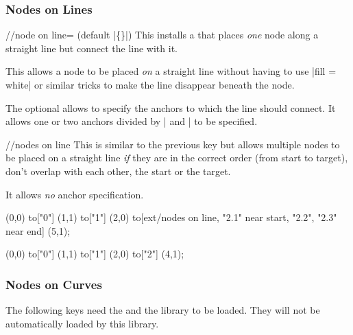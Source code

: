 \begin{multicols}{2}
\subsubsection{Nodes on Lines}

\begin{stylekey}{/\tikzext/node on line= (default |\{\}|)}
This installs a  that places \emph{one}
node along a straight line but connect the line with it.

This allows a node to be placed \emph{on} a straight line without having to
use |fill = white| or similar tricks to make the line disappear 
beneath the node.

The optional  allows to specify the
anchors to which the line should connect.
It allows one or two anchors divided by | and | to be specified.
\end{stylekey}

\begin{stylekey}{/\tikzext/nodes on line}
This is similar to the previous key but allows
multiple nodes to be placed on a straight line
\emph{if} they are in the correct order (from start to target),
don't overlap with each other, the start or the target.

It allows \emph{no} anchor specification.
\end{stylekey}

\begin{codeexample}[preamble=\usetikzlibrary{ext.nodes, quotes}]
\tikz[inner sep=.15em, circle, nodes=draw, sloped]
   (0,0) to["0"] (1,1)
                                                 to["1"] (2,0)
    to[ext/nodes on line, "2.1" near start, "2.2", "2.3" near end] (5,1);
\end{codeexample}
\begin{codeexample}[preamble=\usetikzlibrary{ext.nodes, quotes}]
\tikz[inner sep=.15em, nodes=draw]
  \draw[thick, ->, ext/node on line=west and east]
     (0,0) to["0"] (1,1)
           to["1"] (2,0)
           to["2"] (4,1);
\end{codeexample}

\subsubsection{Nodes on Curves}
The following keys need the 
and the  \cite{spath3}
library to be loaded. They will not be automatically
loaded by this library.


\end{multicols}
